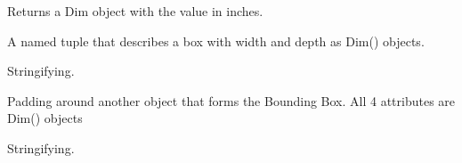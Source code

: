 \documentclass[letterpaper,10pt,english]{sphinxmanual}
\begin{document}

\begin{fulllineitems}
\label{\detokenize{ref/util/plot/Coord:TotalDepth.util.plot.Coord.dimIn}}
Returns a Dim object with the value in inches.

\end{fulllineitems}


\begin{fulllineitems}
\label{\detokenize{ref/util/plot/Coord:TotalDepth.util.plot.Coord.Box}}
A named tuple that describes a box with width and depth as Dim() objects.

\begin{fulllineitems}
\label{\detokenize{ref/util/plot/Coord:TotalDepth.util.plot.Coord.Box.__str__}}
Stringifying.

\end{fulllineitems}


\end{fulllineitems}


\begin{fulllineitems}
\label{\detokenize{ref/util/plot/Coord:TotalDepth.util.plot.Coord.Pad}}
Padding around another object that forms the Bounding Box.
All 4 attributes are Dim() objects

\begin{fulllineitems}
\label{\detokenize{ref/util/plot/Coord:TotalDepth.util.plot.Coord.Pad.__str__}}
Stringifying.

\end{fulllineitems}


\end{fulllineitems}

\end{document}
